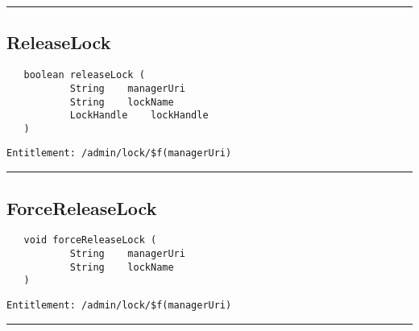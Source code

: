 \rule{12cm}{2pt}
\subsection{ReleaseLock}
\label{Api:ReleaseLock}
\begin{verbatim}
   boolean releaseLock (
           String    managerUri
           String    lockName
           LockHandle    lockHandle
   )
\end{verbatim}
\begin{Verbatim}[fontsize=\small, formatcom=\color{Maroon}]
  Entitlement: /admin/lock/$f(managerUri)
\end{Verbatim}



\rule{12cm}{2pt}
\subsection{ForceReleaseLock}
\label{Api:ForceReleaseLock}
\begin{verbatim}
   void forceReleaseLock (
           String    managerUri
           String    lockName
   )
\end{verbatim}
\begin{Verbatim}[fontsize=\small, formatcom=\color{Maroon}]
  Entitlement: /admin/lock/$f(managerUri)
\end{Verbatim}



\rule{12cm}{2pt}
